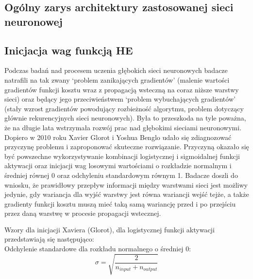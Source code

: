 \documentclass[a4paper,11pt]{article}
\begin{document}
    \subsection{Ogólny zarys architektury zastosowanej sieci neuronowej}

    \subsection{Inicjacja wag funkcją HE}

    Podczas badań nad procesem uczenia głębokich sieci neuronowych badacze natrafili na tak zwany `problem zanikających gradientów' (malenie wartości gradientów funkcji kosztu wraz z propagacją wsteczną na coraz niższe warstwy sieci) oraz będący jego przeciwieństwem `problem wybuchających gradientów' (stały wzrost gradientów powodujący rozbieżność algorytmu, problem dotyczący głównie rekurencyjnych sieci neuronowych)\cite{UczenieMaszynowe2018}. Była to przeszkoda na tyle poważna, że na długie lata wstrzymała rozwój prac nad głębokimi sieciami neuronowymi. Dopiero w 2010 roku Xavier Glorot i Yoshua Benglo udało się zdiagnozować przyczynę problemu i zaproponować skuteczne rozwiązanie. Przyczyną okazało się być powszechne wykorzystywanie kombinacji logistycznej i sigmoidalnej funkcji aktywacji oraz inicjacji wag losowymi wartościami o rozkładzie normalnym i średniej równej 0 oraz odchyleniu standardowym równym 1. Badacze doszli do wniosku, że prawidłowy przepływ informacji między warstwami sieci jest możliwy jedynie, gdy wariancja dla wyjść warstwy jest równa wariancji wejść tejże, a także gradienty funkcji kosztu muszą mieć taką samą wariancję przed i po przejściu przez daną warstwę w procesie propagacji wstecznej\cite{UnderstandingTheDifficultyOfTrainingDeepFeedforwardNeuralNetworks2010}.

    \bigskip

    \noindent
    \begin{minipage}[H]{\textwidth}
        \setlength\parindent{17pt} Wzory dla inicjacji Xaviera (Glorot), dla logistycznej funkcji aktywacji przedstawiają się następująco: \\
        \bigskip
        \setlength\parindent{17pt} Odchylenie standardowe dla rozkładu normalnego o średniej 0: \\
        \begin{equation}
            \label{eq:std_dev_xavier}
            \sigma = \sqrt{\frac{2}{n_{input} + n_{output}}}
        \end{equation}
    \end{minipage}
\end{document}
